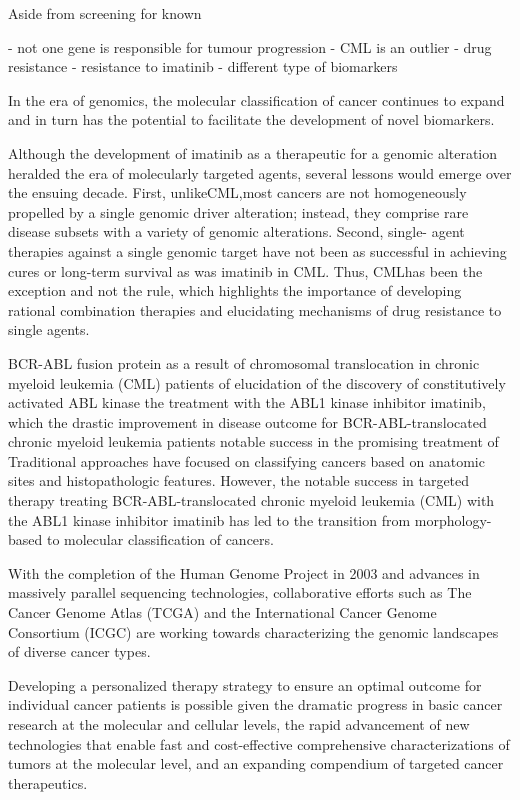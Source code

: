 Aside from screening for known

- not one gene is responsible for tumour progression - CML is an outlier
- drug resistance - resistance to imatinib
- different type of biomarkers

In the era of genomics, the molecular classification of cancer continues to expand and in turn
has the potential to facilitate the development of novel biomarkers.

Although the development of imatinib as a therapeutic for a genomic alteration heralded the
era of molecularly targeted agents, several lessons would emerge over the ensuing decade. First, unlikeCML,most cancers are not homogeneously propelled by a single genomic driver alteration; instead, they comprise rare disease subsets with a variety of genomic alterations. Second, single- agent therapies against a single genomic target have not been as successful in achieving cures or long-term survival as was imatinib in CML. Thus, CMLhas been the exception and not the rule, which highlights the importance of developing rational combination therapies and elucidating mechanisms of drug resistance to single agents.

BCR-ABL fusion protein as a result of chromosomal translocation in chronic myeloid leukemia (CML) patients
of elucidation of the discovery of constitutively activated ABL kinase  the treatment with the ABL1 kinase inhibitor imatinib, which the drastic improvement in disease outcome for BCR-ABL-translocated chronic myeloid leukemia patients notable success in the promising treatment of Traditional approaches have focused on classifying cancers based on anatomic sites and histopathologic features. However, the notable success in targeted therapy treating BCR-ABL-translocated chronic myeloid leukemia (CML) with the ABL1 kinase inhibitor imatinib has led to the transition from morphology-based to molecular classification of cancers.

With the completion of the Human Genome Project in 2003 and advances in massively parallel sequencing technologies, collaborative efforts such as The Cancer Genome Atlas (TCGA) and the International Cancer Genome Consortium (ICGC) are working towards characterizing the genomic landscapes of diverse cancer types.

Developing a personalized therapy strategy to ensure an optimal outcome for individual cancer patients is possible given the dramatic progress in basic cancer research at the molecular and cellular levels, the rapid advancement of new technologies that enable fast and cost-effective comprehensive characterizations of tumors at the molecular level, and an expanding compendium of targeted cancer therapeutics.

